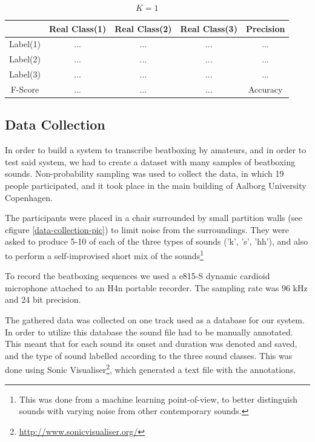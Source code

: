 			\begin{table}
				\centering
				\begin{tabular}{|c | c | c | c | c |}
					\hline
				 & Real Class(1) & Real Class(2) & Real Class(3) & Precision\\ \hline
					Label(1)  & ... & ... & ... & ...\\ \hline
					Label(2)  & ... & ... & ... & ...\\ \hline
					Label(3) & ... & ... & ... & ...\\ \hline
					F-Score & ... & ... & ... & Accuracy \\ \cline{1-4}
				\end{tabular}
				\caption{$K=1$}
				\label{table:eval:explanatory}
			\end{table}
		
		
	\subsection{Data Collection}
	\label{sec:data-collecting}
	In order to build a system to transcribe beatboxing by amateurs, and in order to test said system, we had to create a dataset with many samples of beatboxing sounds. 
	Non-probability sampling was used to collect the data, in which 19 people participated, and it took place in the main building of Aalborg University Copenhagen. 
	
	The participants were placed in a chair surrounded by small partition walls (see cfigure \ref{data-collection-pic}) to limit noise from the surroundings. They were asked to produce 5-10 of each of the three types of sounds ('k', 's', 'hh'), and also to perform a self-improvised short mix of the sounds\footnote{This was done from a machine learning point-of-view, to better distinguish sounds with varying noise from other contemporary sounds.}
	
	To record the beatboxing sequences we used a e815-S dynamic cardioid microphone attached to an H4n portable recorder. The sampling rate was 96 kHz and 24 bit precision.
	
	The gathered data was collected on one track used as a database for our system. In order to utilize this database the sound file had to be manually annotated. This meant that for each sound its onset and duration was denoted and saved, and the type of sound labelled according to the three sound classes. This was done using Sonic Visualiser\footnote{\url{http://www.sonicvisualiser.org/}}, which generated a text file with the annotations.
	
